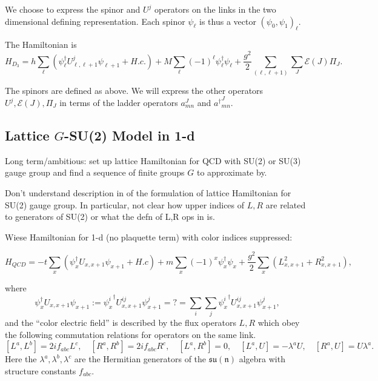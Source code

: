 \documentclass[10pt,reqno]{amsart}
\begin{document}
	We choose to express the spinor and $U^j$ operators on the links in the two dimensional defining representation.
	Each spinor $\psi_{\ell}$ is thus a vector $(\psi_0,\psi_1)_\ell$.
	
	The Hamiltonian is
	\begin{equation}
		H_{D_3}=h\sum_\ell (\psi_\ell^\dagger U_{\ell,\ell+1}^j\psi_{\ell+1}+H.c.) + M\sum_\ell (-1)^\ell \psi_\ell^\dagger\psi_\ell+ \frac{g^2}{2} \sum_{(\ell,\ell+1)} \sum_{J} \mathcal{E}(J)\Pi_J.
	\end{equation}
	
	The spinors are defined as above. 
	We will express the other operators $U^j, \mathcal{E}(J),\Pi_J$ in terms of the ladder operators $a^J_{mn}$ and ${a^\dagger}^J_{mn}$.
	
	\subsection{Lattice $G$-SU(2) Model in 1-d}
	
	Long term/ambitious: set up lattice Hamiltonian for QCD with SU(2) or SU(3) gauge group and find a sequence of finite groups $G$ to approximate by.
	
	Don't understand description in \cite{KogutSusskind75,Wiese13} of the formulation of lattice Hamiltonian for SU(2) gauge group.
	In particular, not clear how upper indices of $L,R$ are related to generators of SU(2) or what the defn of L,R ops in \cite{Wiese13} is.
	
	Wiese Hamiltonian for 1-d (no plaquette term) with color indices suppressed:
	
	\begin{equation}
		H_{QCD}=-t\sum_{x} (\psi_x^\dagger U_{x,x+1} \psi_{x+1} + H.c) + m \sum_{x} (-1)^x \psi_x^\dagger\psi_x + \frac{g^2}{2} \sum_{x} (L_{x,x+1}^2+R_{x,x+1}^2),
	\end{equation}
	
	where 
		\[\psi_x^\dagger U_{x,x+1} \psi_{x+1} := {\psi_x^i}^\dagger U_{x,x+1}^{ij} \psi_{x+1}^j =?= \sum_i \sum_j {\psi_x^i}^\dagger U_{x,x+1}^{ij} \psi_{x+1}^j,\]
	and the ``color electric field'' is described by the flux operators $L,R$ which obey the following commutation relations for operators on the same link.
		\[ [L^a,L^b]=2if_{abc}L^c, \quad [R^a,R^b]=2if_{abc}R^c, \quad [L^a,R^b]=0, \quad [L^a,U]=-\lambda^a U, \quad [R^a,U]=U\lambda^a. \]
	Here the $\lambda^a,\lambda^b,\lambda^c$ are the Hermitian generators of the $\mathfrak{su(n)}$ algebra with structure constants $f_{abc}$.\\
	
\end{document}
